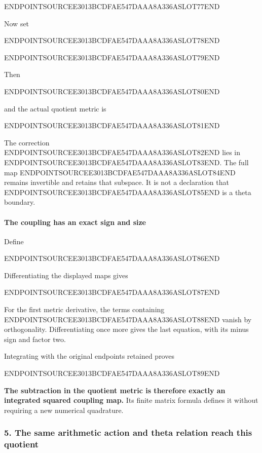 ENDPOINTSOURCEE3013BCDFAE547DAAA8A336ASLOT77END

Now set

ENDPOINTSOURCEE3013BCDFAE547DAAA8A336ASLOT78END

ENDPOINTSOURCEE3013BCDFAE547DAAA8A336ASLOT79END

Then

ENDPOINTSOURCEE3013BCDFAE547DAAA8A336ASLOT80END

and the actual quotient metric is

ENDPOINTSOURCEE3013BCDFAE547DAAA8A336ASLOT81END

The correction ENDPOINTSOURCEE3013BCDFAE547DAAA8A336ASLOT82END lies in ENDPOINTSOURCEE3013BCDFAE547DAAA8A336ASLOT83END. The full map ENDPOINTSOURCEE3013BCDFAE547DAAA8A336ASLOT84END remains invertible and retains that subspace. It is not a declaration that ENDPOINTSOURCEE3013BCDFAE547DAAA8A336ASLOT85END is a theta boundary.

\paragraph{The coupling has an exact sign and size}\label{endpoint-exponential_constituent_original--the-coupling-has-an-exact-sign-and-size}

Define

ENDPOINTSOURCEE3013BCDFAE547DAAA8A336ASLOT86END

Differentiating the displayed maps gives

ENDPOINTSOURCEE3013BCDFAE547DAAA8A336ASLOT87END

For the first metric derivative, the terms containing ENDPOINTSOURCEE3013BCDFAE547DAAA8A336ASLOT88END vanish by orthogonality. Differentiating once more gives the last equation, with its minus sign and factor two.

Integrating with the original endpoints retained proves

ENDPOINTSOURCEE3013BCDFAE547DAAA8A336ASLOT89END

\textbf{The subtraction in the quotient metric is therefore exactly an integrated squared coupling map.} Its finite matrix formula defines it without requiring a new numerical quadrature.

\subsubsection{5. The same arithmetic action and theta relation reach this quotient}\label{endpoint-exponential_constituent_original--the-same-arithmetic-action-and-theta-relation-reach-this-quotient}


